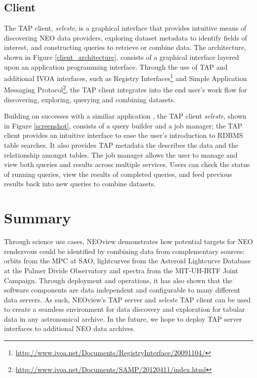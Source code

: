 
\subsection{Client}
The TAP client, \textit{seleste}, is a graphical interface that provides intuitive means of discovering NEO data providers, exploring dataset metadata to identify fields of interest, and constructing queries to retrieve or combine data.  The architecture, shown in Figure \ref{client_architecture}, consists of a graphical interface layered upon an application programming interface.  Through the use of TAP and additional IVOA interfaces, such as Registry Interfaces\footnote{\url{http://www.ivoa.net/Documents/RegistryInterface/20091104/}} and Simple Application Messaging Protocol\footnote{\url{http://www.ivoa.net/Documents/SAMP/20120411/index.html}}, the TAP client integrates into the end user's work flow for discovering, exploring, querying and combining datasets.

Building on successes with a similiar application \citep{cscview}, the TAP client \textit{seleste}, shown in Figure \ref{screenshot}, consists of a query builder and a job manager; the TAP client provides an intuitive interface to ease the user's introduction to RDBMS table searches.  It also provides TAP metadata the describes the data and the relationship amongst tables.  The job manager allows the user to manage and view both queries and results across multiple services.  Users can check the status of running queries, view the results of completed queries, and feed previous results back into new queries to combine datasets. 


\section{Summary}
Through science use cases, NEOview demonstrates how potential targets for NEO rendezvous could be identified by combining data from complementary sources: orbits from the MPC at SAO, lightcurves from the Asteroid Lightcurve Database at the Palmer Divide Observatory and spectra from the MIT-UH-IRTF Joint Campaign. Through deployment and operations, it has also shown that the software components are data independent and configurable to many different data servers. As such, NEOview's TAP server and \textit{seleste} TAP client can be used to create a seamless environment for data discovery and exploration for tabular data in any astronomical archive.  In the future, we hope to deploy TAP server interfaces to additional NEO data archives.

